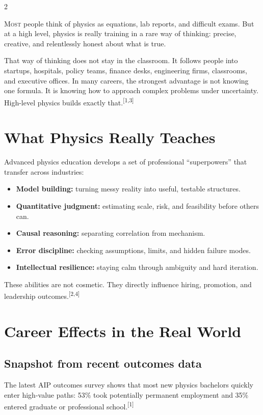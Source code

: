 \documentclass[11pt]{article}
\newcommand{\rcite}[1]{\textsuperscript{[#1]}}
\begin{document}
\begin{multicols}{2}
\RaggedRight

\lettrine[lines=3,loversize=0.08,findent=2pt,nindent=0pt]{M}{ost} people think of physics as equations, lab reports, and difficult exams. But at a high level, physics is really training in a rare way of thinking: precise, creative, and relentlessly honest about what is true.

That way of thinking does not stay in the classroom. It follows people into startups, hospitals, policy teams, finance desks, engineering firms, classrooms, and executive offices. In many careers, the strongest advantage is not knowing one formula. It is knowing how to approach complex problems under uncertainty. High-level physics builds exactly that.\rcite{1,3}

\section*{What Physics Really Teaches}

Advanced physics education develops a set of professional ``superpowers'' that transfer across industries:

\begin{itemize}[leftmargin=1.5em]
  \item \textbf{Model building:} turning messy reality into useful, testable structures.
  \item \textbf{Quantitative judgment:} estimating scale, risk, and feasibility before others can.
  \item \textbf{Causal reasoning:} separating correlation from mechanism.
  \item \textbf{Error discipline:} checking assumptions, limits, and hidden failure modes.
  \item \textbf{Intellectual resilience:} staying calm through ambiguity and hard iteration.
\end{itemize}

These abilities are not cosmetic. They directly influence hiring, promotion, and leadership outcomes.\rcite{2,4}

\section*{Career Effects in the Real World}

\subsection*{Snapshot from recent outcomes data}
The latest AIP outcomes survey shows that most new physics bachelors quickly enter high-value paths: 53\% took potentially permanent employment and 35\% entered graduate or professional school.\rcite{1}


\end{multicols}
\end{document}
